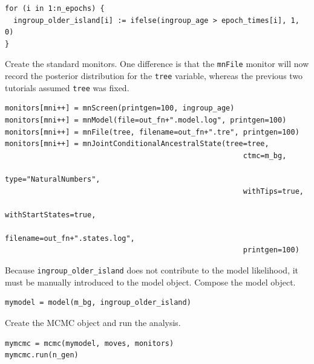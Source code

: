 \begin{snugshade}
\begin{lstlisting}
for (i in 1:n_epochs) {
  ingroup_older_island[i] := ifelse(ingroup_age > epoch_times[i], 1, 0)
}
\end{lstlisting}
\end{snugshade}

Create the standard monitors.
One difference is that the {\tt mnFile} monitor will now record the posterior distribution for the {\tt tree} variable, whereas the previous two tutorials assumed {\tt tree} was fixed.

\begin{snugshade}
\begin{lstlisting}
monitors[mni++] = mnScreen(printgen=100, ingroup_age)
monitors[mni++] = mnModel(file=out_fn+".model.log", printgen=100)
monitors[mni++] = mnFile(tree, filename=out_fn+".tre", printgen=100)
monitors[mni++] = mnJointConditionalAncestralState(tree=tree,
                                                       ctmc=m_bg,
                                                       type="NaturalNumbers",
                                                       withTips=true,
                                                       withStartStates=true,
                                                       filename=out_fn+".states.log",
                                                       printgen=100)
\end{lstlisting}
\end{snugshade}


Because {\tt ingroup\_older\_island} does not contribute to the model likelihood, it must be manually introduced to the model object.
Compose the model object.

\begin{snugshade}
\begin{lstlisting}
mymodel = model(m_bg, ingroup_older_island)
\end{lstlisting}
\end{snugshade}

Create the MCMC object and run the analysis.

\begin{snugshade}
\begin{lstlisting}
mymcmc = mcmc(mymodel, moves, monitors)
mymcmc.run(n_gen)
\end{lstlisting}
\end{snugshade}

